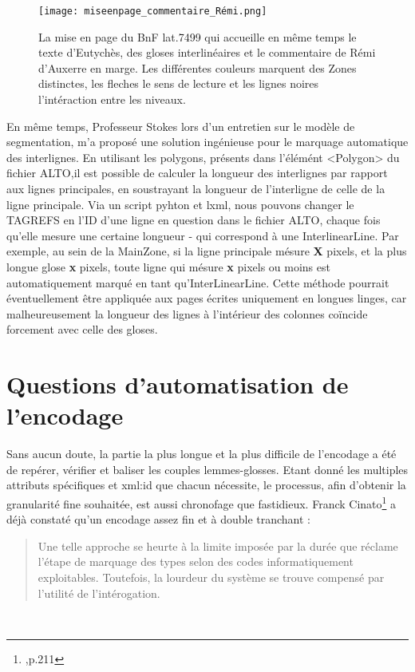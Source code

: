 \documentclass[a4paper, twoside, 12pt]{book}
\begin{document}
\begin{figure}[H]
    \centering
    \texttt{[image: miseenpage\_commentaire\_Rémi.png]}
    \caption{La mise en page du BnF lat.7499 qui accueille en même temps le texte d'Eutychès, des gloses interlinéaires et le commentaire de Rémi d'Auxerre en marge. Les différentes couleurs marquent des Zones distinctes, les fleches le sens de lecture et les lignes noires l'intéraction entre les niveaux.}
\end{figure}

En même temps, Professeur Stokes lors d'un entretien sur le modèle de segmentation, m'a proposé une solution ingénieuse pour le marquage automatique des interlignes. En utilisant les polygons, présents dans l'élémént <Polygon> du fichier ALTO,il est possible de calculer la longueur des interlignes par rapport aux lignes principales, en soustrayant la longueur de l'interligne de celle de la ligne principale. Via un script pyhton et lxml, nous pouvons changer le TAGREFS en l'ID d'une ligne en question dans le fichier ALTO, chaque fois qu'elle mesure une certaine longueur - qui correspond à une InterlinearLine. Par exemple, au sein de la MainZone, si la ligne principale mésure \textbf{X} pixels, et la plus longue glose \textbf{x} pixels, toute ligne qui mésure \textbf{x} pixels ou moins est automatiquement marqué en tant qu'InterLinearLine. Cette méthode pourrait éventuellement être appliquée aux pages écrites uniquement en longues linges, car malheureusement la longueur des lignes à l'intérieur des colonnes coïncide forcement avec celle des gloses.

\section{Questions d'automatisation de l'encodage}

Sans aucun doute, la partie la plus longue et la plus difficile de l'encodage a été de repérer, vérifier et baliser les couples lemmes-glosses. Etant donné les multiples attributs spécifiques et xml:id que chacun nécessite, le processus, afin d'obtenir la granularité fine souhaitée, est aussi chronofage que fastidieux. Franck Cinato\footnote{\cite{cinato2015priscien},p.211} a déjà constaté qu'un encodage assez fin et à double tranchant : \blockquote{Une telle approche se heurte à la limite imposée par la durée que réclame l’étape de marquage des types selon des codes informatiquement exploitables. Toutefois, la lourdeur du système se trouve compensé par l'utilité de l'intérogation.} \\
\end{document}
